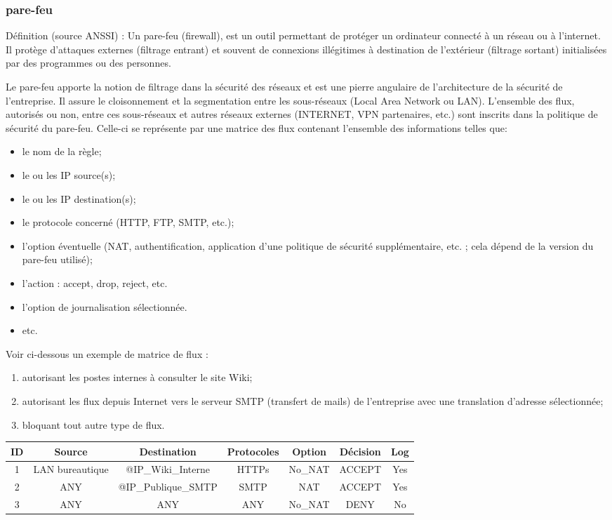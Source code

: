 \subsubsection{pare-feu}
Définition (source ANSSI) :
Un pare-feu (firewall), est un outil permettant de protéger un ordinateur connecté à un réseau ou à l’internet. Il protège d’attaques externes (filtrage entrant) et souvent de connexions illégitimes à destination de l’extérieur (filtrage sortant) initialisées par des programmes ou des personnes.

Le pare-feu apporte la notion de filtrage dans la sécurité des réseaux et est une pierre angulaire de l'architecture de la sécurité de l'entreprise.
Il assure le cloisonnement et la segmentation entre les sous-réseaux (Local Area Network ou LAN).
L'ensemble des flux, autorisés ou non, entre ces sous-réseaux et autres réseaux externes (INTERNET, VPN partenaires, etc.) sont inscrits dans la politique de sécurité du pare-feu.
Celle-ci se représente par une matrice des flux contenant l'ensemble des informations telles que:
\begin{itemize}
    \item le nom de la règle;
    \item le ou les IP source(s);
    \item le ou les IP destination(s);
    \item le protocole concerné (HTTP, FTP, SMTP, etc.);
    \item l'option éventuelle (NAT, authentification, application d'une politique de sécurité supplémentaire, etc. ; cela dépend de la version du pare-feu utilisé);
    \item l'action : accept, drop, reject, etc.
    \item l'option de journalisation sélectionnée.
    \item etc.
\end{itemize}

Voir ci-dessous un exemple de matrice de flux : 
\begin{enumerate}
    \item autorisant les postes internes à consulter le site Wiki;
    \item autorisant les flux depuis Internet vers le serveur SMTP (transfert de mails) de l'entreprise avec une translation d'adresse sélectionnée;
    \item bloquant tout autre type de flux.
\end{enumerate}

\begin{center}
\begin{tabular}{||c c c c c c c ||} 
 \hline
 ID & Source & Destination & Protocoles & Option & Décision & Log \\ [0.5ex] 
 \hline\hline
 1 & LAN bureautique & @IP_Wiki_Interne & HTTPs & No_NAT & ACCEPT & Yes \\ 
 \hline
 2 & ANY & @IP_Publique_SMTP & SMTP & NAT & ACCEPT & Yes \\
 \hline
 3 & ANY & ANY & ANY & No_NAT & DENY & No \\
 \hline
\end{tabular}
\end{center}

